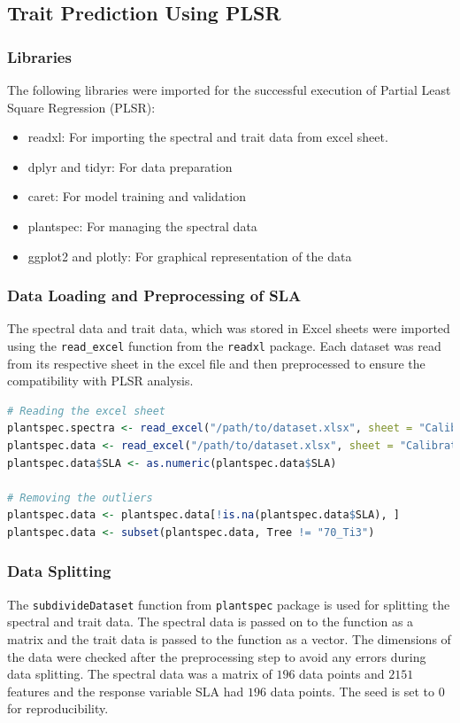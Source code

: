 \documentclass[12pt,a4paper]{report}
\begin{document}
\subsection{Trait Prediction Using PLSR}
\subsubsection*{Libraries}
The following libraries were imported for the successful execution of Partial Least Square Regression (PLSR): \\
\begin{itemize}
    \item readxl: For importing the spectral and trait data from excel sheet.
    \item dplyr and tidyr: For data preparation
    \item caret: For model training and validation
    \item plantspec: For managing the spectral data
    \item ggplot2 and plotly: For graphical representation of the data
\end{itemize}

\subsubsection*{Data Loading and Preprocessing of SLA}
The spectral data and trait data, which was stored in Excel sheets were imported using the \texttt{read\_excel} function from the \texttt{readxl} package. Each dataset was read from its respective sheet in the excel file and then preprocessed to ensure the compatibility with PLSR analysis. \\

\begin{lstlisting}[language=R, style=mystyle]
# Reading the excel sheet
plantspec.spectra <- read_excel("/path/to/dataset.xlsx", sheet = "Calibration set spectra")
plantspec.data <- read_excel("/path/to/dataset.xlsx", sheet = "Calibration set traits")
plantspec.data$SLA <- as.numeric(plantspec.data$SLA)

# Removing the outliers
plantspec.data <- plantspec.data[!is.na(plantspec.data$SLA), ]
plantspec.data <- subset(plantspec.data, Tree != "70_Ti3")
\end{lstlisting}

\subsubsection*{Data Splitting}
The \texttt{subdivideDataset} function from \texttt{plantspec} package is used for splitting the spectral and trait data. The spectral data is passed on to the function as a matrix and the trait data is passed to the function as a vector. The dimensions of the data were checked after the preprocessing step to avoid any errors during data splitting. The spectral data was a matrix of $196$ data points and $2151$ features and the response variable SLA had $196$ data points. The seed is set to $0$ for reproducibility. \\
\end{document}
